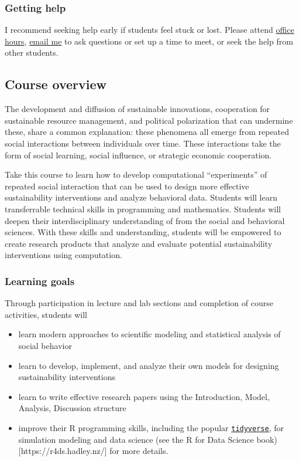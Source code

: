 \documentclass[
]{article}
\providecommand{\tightlist}{%
  \setlength{\itemsep}{0pt}\setlength{\parskip}{0pt}}
\begin{document}
\subsubsection{Getting help}\label{getting-help}

I recommend seeking help early if students feel stuck or lost. Please
attend \hyperref[office-hours]{office hours},
\href{mailto:maturner@stanford.edu}{email me} to ask questions or set up
a time to meet, or seek the help from other students.

\subsection{Course overview}\label{course-overview}

The development and diffusion of sustainable innovations, cooperation
for sustainable resource management, and political polarization that can
undermine these, share a common explanation: these phenomena all emerge
from repeated social interactions between individuals over time. These
interactions take the form of social learning, social influence, or
strategic economic cooperation.

Take this course to learn how to develop computational ``experiments''
of repeated social interaction that can be used to design more effective
sustainability interventions and analyze behavioral data. Students will
learn transferrable technical skills in programming and mathematics.
Students will deepen their interdisciplinary understanding of from the
social and behavioral sciences. With these skills and understanding,
students will be empowered to create research products that analyze and
evaluate potential sustainability interventions using computation.

\subsubsection{Learning goals}\label{learning-goals}

Through participation in lecture and lab sections and completion of
course activities, students will

\begin{itemize}
\tightlist
\item
  learn modern approaches to scientific modeling and statistical
  analysis of social behavior
\item
  learn to develop, implement, and analyze their own models for
  designing sustainability interventions
\item
  learn to write effective research papers using the Introduction,
  Model, Analysis, Discussion structure
\item
  improve their R programming skills, including the popular
  \href{https://www.tidyverse.org/}{\texttt{tidyverse}}, for simulation
  modeling and data science (see the R for Data Science
  book){[}https://r4ds.hadley.nz/{]} for more details.
\end{itemize}
\end{document}
